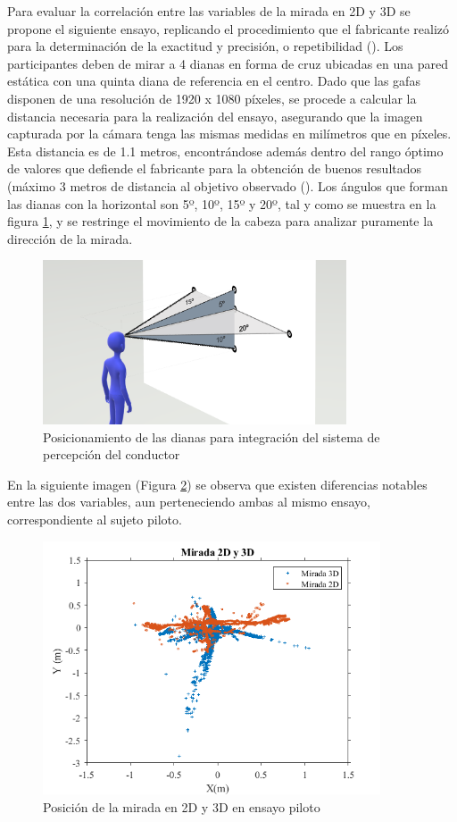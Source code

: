 Para evaluar la correlación entre las variables de la mirada en 2D y 3D se propone el siguiente ensayo, replicando el procedimiento que el fabricante realizó para la determinación de la exactitud y precisión, o repetibilidad (\cite{tobii}). Los participantes deben de mirar a 4 dianas en forma de cruz ubicadas en una pared estática con una quinta diana de referencia en el centro. Dado que las gafas disponen de una resolución de 1920 x 1080 píxeles, se procede a calcular la distancia necesaria para la realización del ensayo, asegurando que la imagen capturada por la cámara tenga las mismas medidas en milímetros que en píxeles. Esta distancia es de 1.1 metros, encontrándose además dentro del rango óptimo de valores que defiende el fabricante para la obtención de buenos resultados (máximo 3 metros de distancia al objetivo observado (\cite{tobii}). Los ángulos que forman las dianas con la horizontal son 5º, 10º, 15º y 20º, tal y como se muestra en la figura \ref{fig:4.10}, y se restringe el movimiento de la cabeza para analizar puramente la dirección de la mirada.

\begin{figure}[h]
    \centering
    \includegraphics[width=9cm]
    {figures/4.10.png}
    \caption{ \label{fig:4.10} Posicionamiento de las dianas para integración del sistema de percepción del conductor}
\end{figure}

En la siguiente imagen (Figura \ref{fig:4.11}) se observa que existen diferencias notables entre las dos variables, aun perteneciendo ambas al mismo ensayo, correspondiente al sujeto piloto.

\vspace{-10pt}
\begin{figure}[h]
    \centering
    \includegraphics[width=10cm]
    {figures/4.11.png}
    \caption{ \label{fig:4.11} Posición de la mirada en 2D y 3D en ensayo piloto}
\end{figure}

